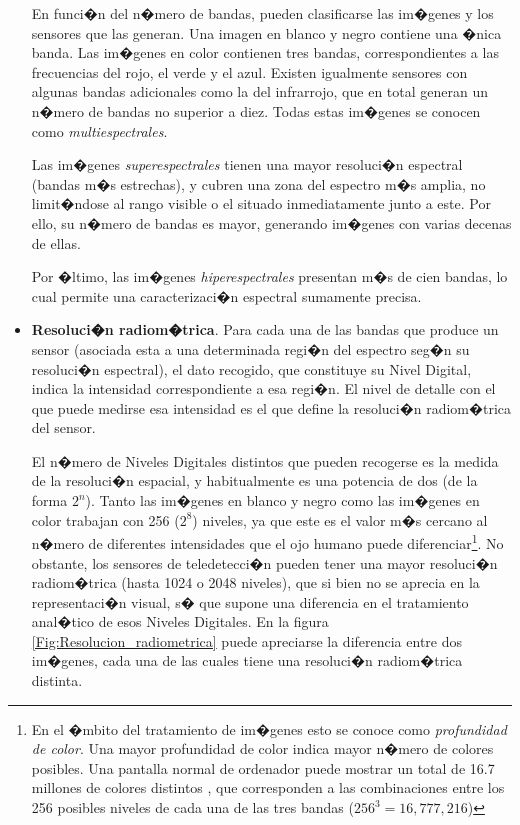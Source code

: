 \begin{itemize}
	En funci�n del n�mero de bandas, pueden clasificarse las im�genes y los sensores que las generan. Una imagen en blanco y negro contiene una �nica banda. Las im�genes en color contienen tres bandas, correspondientes a las frecuencias del rojo, el verde y el azul. Existen igualmente sensores con algunas bandas adicionales como la del infrarrojo, que en total generan un n�mero de bandas no superior a diez. Todas estas im�genes se conocen como \emph{multiespectrales}. 
	
	Las im�genes \emph{superespectrales} tienen una mayor resoluci�n espectral (bandas m�s estrechas), y cubren una zona del espectro m�s amplia, no limit�ndose al rango visible o el situado inmediatamente junto a este. Por ello, su n�mero de bandas es mayor, generando im�genes con varias decenas de ellas. 
	
	Por �ltimo, las im�genes \emph{hiperespectrales} presentan m�s de cien bandas, lo cual permite una caracterizaci�n espectral sumamente precisa.
	\item \textbf{Resoluci�n radiom�trica}. Para cada una de las bandas que produce un sensor (asociada esta a una determinada regi�n del espectro seg�n su resoluci�n espectral), el dato recogido, que constituye su Nivel Digital, indica la intensidad correspondiente a esa regi�n. El nivel de detalle con el que puede medirse esa intensidad es el que define la resoluci�n radiom�trica del sensor.
	
	El n�mero de Niveles Digitales distintos que pueden recogerse es la medida de la resoluci�n espacial, y habitualmente es una potencia de dos (de la forma $2^n$). Tanto las im�genes en blanco y negro como las im�genes en color trabajan con 256 ($2^8$) niveles, ya que este es el valor m�s cercano al n�mero de diferentes intensidades que el ojo humano puede diferenciar\footnote{En el �mbito del tratamiento de im�genes esto se conoce como \emph{profundidad de color}. Una mayor profundidad de color indica mayor n�mero de colores posibles. Una pantalla normal de ordenador puede mostrar un total de 16.7 millones de colores distintos , que corresponden a las combinaciones entre los 256 posibles niveles de cada una de las tres bandas ($256 ^3 = 16,777,216$)}. No obstante, los sensores de teledetecci�n pueden tener una mayor resoluci�n radiom�trica (hasta 1024 o 2048 niveles), que si bien no se aprecia en la representaci�n visual, s� que supone una diferencia en el tratamiento anal�tico de esos Niveles Digitales.
	En la figura \ref{Fig:Resolucion_radiometrica} puede apreciarse la diferencia entre dos im�genes, cada una de las cuales tiene una resoluci�n radiom�trica distinta.


\end{itemize}
